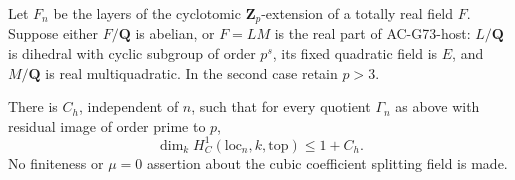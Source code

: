 \begin{proposition}
\label{prop:ACG76host}
Let \(F_n\) be the layers of the cyclotomic \(\mathbf Z_p\)-extension of a totally real field \(F\). Suppose either \(F/\mathbf Q\) is abelian, or \(F=LM\) is the real part of AC-G73-host: \(L/\mathbf Q\) is dihedral with cyclic subgroup of order \(p^s\), its fixed quadratic field is \(E\), and \(M/\mathbf Q\) is real multiquadratic. In the second case retain \(p>3\).

There is \(C_h\), independent of \(n\), such that for every quotient \(\Gamma_n\) as above with residual image of order prime to \(p\),
\[
 \dim_k H^1_C(\mathrm{loc}_n,k,\mathrm{top})\le 1+C_h.
 \tag{G76.6}
\]
No finiteness or \(\mu=0\) assertion about the cubic coefficient splitting field is made.
\end{proposition}


